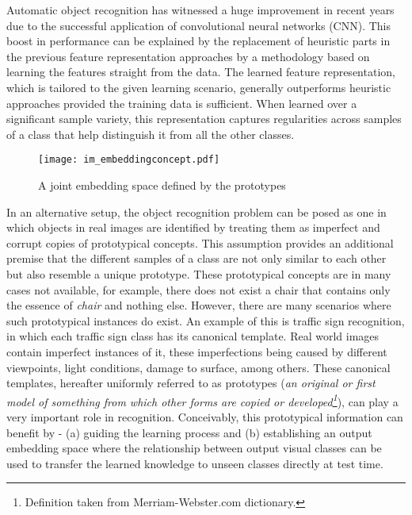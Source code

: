 \documentclass{bmvc2k}
\begin{document}
Automatic object recognition has witnessed a huge improvement in recent years due to the successful 
application of convolutional neural networks (CNN). This boost in performance can be explained by 
the replacement of heuristic parts in the previous feature representation approaches by a methodology 
\cite{Lee/icml2009,Krizhevsky/nips2012} based on learning the features straight from the data. 
The learned feature representation, which is tailored to the given learning scenario, generally 
outperforms heuristic approaches provided the training data is sufficient.
When learned over a significant sample variety, this representation captures regularities across samples of a class 
that help distinguish it from all the other classes.      
\begin{figure}
\begin{center}
\texttt{[image: im\_embeddingconcept.pdf]}
\end{center}
\protect\caption{\label{fig:scheme} A joint embedding space defined by
the prototypes}
\end{figure}

In an alternative setup, the object recognition problem can be posed as one
in which objects in real images are identified by treating them as imperfect and corrupt copies 
of prototypical concepts. This assumption provides an additional premise that
the different samples of a class are not only similar to each other but also resemble a 
unique prototype. These prototypical concepts are in many cases not
available, for example, there does not exist a chair that contains only the
essence of \textit{chair} and nothing else.
However, there are many scenarios where such prototypical instances do exist. An example of this is traffic 
sign recognition, in which each traffic sign class has its canonical template. Real world images contain 
imperfect instances of it, these imperfections being caused by different viewpoints, light conditions, 
damage to surface, among others. These canonical templates, hereafter
uniformly referred to as prototypes (\textit{an original or first model of
something from which other forms are copied or developed\footnote{Definition taken from Merriam-Webster.com dictionary.%
}}), can play a very important role in recognition.
Conceivably, this prototypical information can benefit by - (a) guiding the learning process and 
(b) establishing an output embedding space where the relationship between
output visual classes can be used to transfer the learned knowledge to unseen
classes directly at test time.
\end{document}
